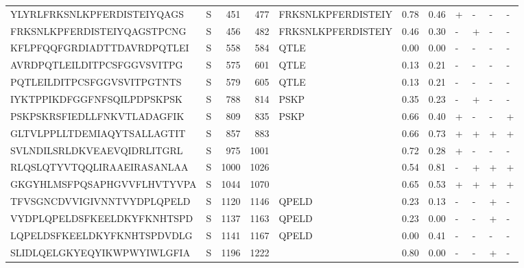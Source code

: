 \begin{tabular}{llrrlrrllll}
YLYRLFRKSNLKPFERDISTEIYQAGS &       S &    451 &   477 &  FRKSNLKPFERDISTEIY &            0.78 &             0.46 &      + &       - &      - &       - \\
FRKSNLKPFERDISTEIYQAGSTPCNG &       S &    456 &   482 &  FRKSNLKPFERDISTEIY &            0.46 &             0.30 &      - &       + &      - &       - \\
KFLPFQQFGRDIADTTDAVRDPQTLEI &       S &    558 &   584 &                QTLE &            0.00 &             0.00 &      - &       - &      - &       - \\
AVRDPQTLEILDITPCSFGGVSVITPG &       S &    575 &   601 &                QTLE &            0.13 &             0.21 &      - &       - &      - &       - \\
PQTLEILDITPCSFGGVSVITPGTNTS &       S &    579 &   605 &                QTLE &            0.13 &             0.21 &      - &       - &      - &       - \\
IYKTPPIKDFGGFNFSQILPDPSKPSK &       S &    788 &   814 &                PSKP &            0.35 &             0.23 &      - &       + &      - &       - \\
PSKPSKRSFIEDLLFNKVTLADAGFIK &       S &    809 &   835 &                PSKP &            0.66 &             0.40 &      + &       - &      - &       + \\
GLTVLPPLLTDEMIAQYTSALLAGTIT &       S &    857 &   883 &                     &            0.66 &             0.73 &      + &       + &      + &       + \\
SVLNDILSRLDKVEAEVQIDRLITGRL &       S &    975 &  1001 &                     &            0.72 &             0.28 &      + &       - &      - &       - \\
RLQSLQTYVTQQLIRAAEIRASANLAA &       S &   1000 &  1026 &                     &            0.54 &             0.81 &      - &       + &      + &       + \\
GKGYHLMSFPQSAPHGVVFLHVTYVPA &       S &   1044 &  1070 &                     &            0.65 &             0.53 &      + &       + &      + &       + \\
TFVSGNCDVVIGIVNNTVYDPLQPELD &       S &   1120 &  1146 &               QPELD &            0.23 &             0.13 &      - &       - &      + &       - \\
VYDPLQPELDSFKEELDKYFKNHTSPD &       S &   1137 &  1163 &               QPELD &            0.23 &             0.00 &      - &       - &      + &       - \\
LQPELDSFKEELDKYFKNHTSPDVDLG &       S &   1141 &  1167 &               QPELD &            0.00 &             0.41 &      - &       - &      - &       - \\
SLIDLQELGKYEQYIKWPWYIWLGFIA &       S &   1196 &  1222 &                     &            0.80 &             0.00 &      - &       - &      + &       - \\
\bottomrule
\end{tabular}
